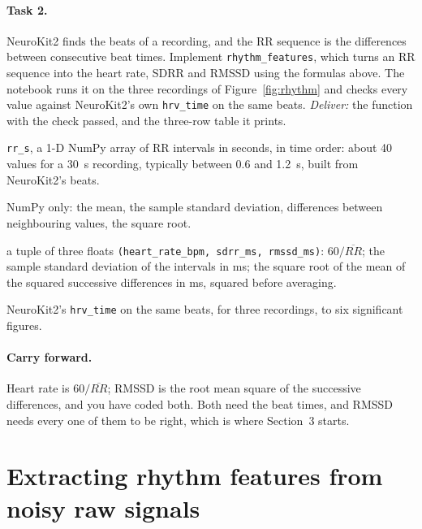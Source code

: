 \documentclass[12pt,article,oneside,linkcolour=blue]{oxengthesis}
\newcommand{\nb}[1]{\noindent{\small\textsf{Notebook: #1}}\par\nopagebreak\smallskip}
\begin{document}
\paragraph{Task 2.} NeuroKit2 finds the beats of a recording, and the RR sequence
is the differences between consecutive beat times. Implement \texttt{rhythm\_features}, which
turns an RR sequence into the heart rate, SDRR and RMSSD using the formulas above. The notebook
runs it on the three recordings of Figure~\ref{fig:rhythm} and checks every value against
NeuroKit2's own \texttt{hrv\_time} on the same beats. \emph{Deliver:} the function with the
check passed, and the three-row table it prints.

\begin{tcolorbox}[breakable, title=Specification: \texttt{rhythm\_features(rr\_s)}, colback=white, colframe=black!60]
\begin{description}[leftmargin=*, itemsep=2pt, font=\bfseries]
  \item[Given] \texttt{rr\_s}, a 1-D NumPy array of RR intervals in seconds, in time order: about 40 values for a \SI{30}{\second} recording, typically between 0.6 and \SI{1.2}{\second}, built from NeuroKit2's beats.
  \item[You may use] NumPy only: the mean, the sample standard deviation, differences between neighbouring values, the square root.
  \item[Return] a tuple of three floats \texttt{(heart\_rate\_bpm, sdrr\_ms, rmssd\_ms)}: $60 / \overline{RR}$; the sample standard deviation of the intervals in ms; the square root of the mean of the squared successive differences in ms, squared before averaging.
  \item[Checked by] NeuroKit2's \texttt{hrv\_time} on the same beats, for three recordings, to six significant figures.
\end{description}
\end{tcolorbox}

\paragraph{Carry forward.} Heart rate is $60 / \overline{RR}$; RMSSD is the root mean square of
the successive differences, and you have coded both. Both need the beat times, and RMSSD needs
every one of them to be right, which is where Section~3 starts.


\section{Extracting rhythm features from noisy raw signals}
\nb{Section 3}
\end{document}
